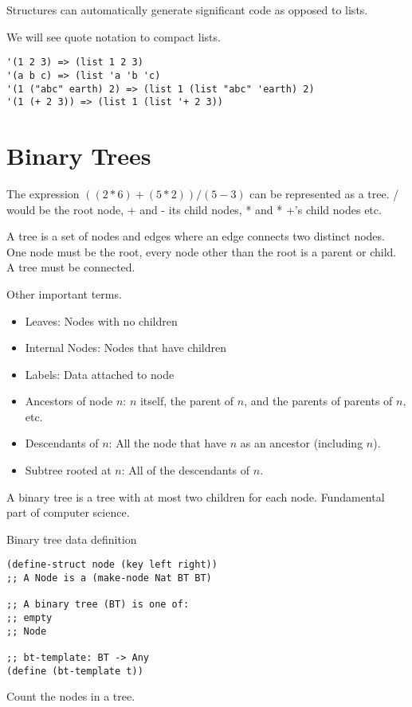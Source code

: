 \documentclass{article}
\begin{document}
Structures can automatically generate significant code as opposed to lists. 


We will see quote notation to compact lists. 

\begin{lstlisting}
'(1 2 3) => (list 1 2 3)
'(a b c) => (list 'a 'b 'c)
'(1 ("abc" earth) 2) => (list 1 (list "abc" 'earth) 2)
'(1 (+ 2 3)) => (list 1 (list '+ 2 3))
\end{lstlisting}

\section{Binary Trees}

The expression $((2 * 6) + (5 * 2))/(5-3)$ can be represented as a tree. / would be the root node, + and - its child nodes, * and * +'s child nodes etc.

A tree is a set of nodes and edges where an edge connects two distinct nodes. One node must be the root, every node other than the root is a parent or child. A tree must be connected. 

Other important terms. 
\begin{itemize}
    \item Leaves: Nodes with no children
    \item Internal Nodes: Nodes that have children
    \item Labels: Data attached to node
    \item Ancestors of node $n$: $n$ itself, the parent of $n$, and the parents of parents of $n$, etc.
    \item Descendants of $n$: All the node that have $n$ as an ancestor (including $n$). 
    \item Subtree rooted at $n$: All of the descendants of $n$. 
\end{itemize}


A binary tree is a tree with at most two children for each node. Fundamental part of computer science. 

Binary tree data definition

\begin{lstlisting}
(define-struct node (key left right))
;; A Node is a (make-node Nat BT BT)

;; A binary tree (BT) is one of:
;; empty
;; Node

;; bt-template: BT -> Any
(define (bt-template t))
\end{lstlisting}

Count the nodes in a tree. 
\end{document}
